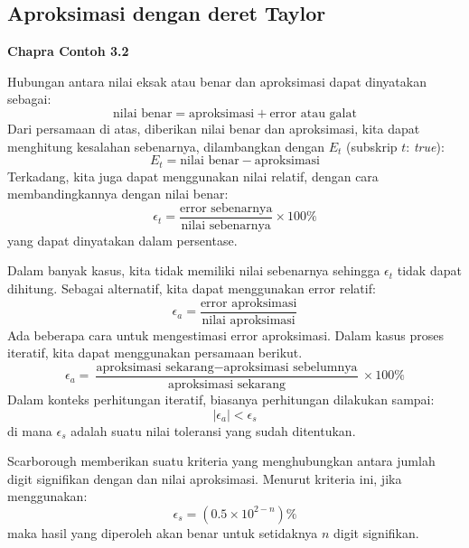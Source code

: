 \subsection{Aproksimasi dengan deret Taylor}

\textbf{Chapra Contoh 3.2}

Hubungan antara nilai eksak atau benar dan aproksimasi dapat dinyatakan
sebagai:
\begin{equation*}
\text{nilai benar} = \text{aproksimasi} + \text{error atau galat}
\end{equation*}
Dari persamaan di atas, diberikan nilai benar dan aproksimasi, kita dapat menghitung
kesalahan sebenarnya, dilambangkan dengan $E_t$ (subskrip $t$: \textit{true}):
\begin{equation}
E_t = \text{nilai benar} - \text{aproksimasi}
\end{equation}
Terkadang, kita juga dapat menggunakan nilai relatif, dengan cara membandingkannya
dengan nilai benar:
\begin{equation}
\epsilon_{t} = \frac{\text{error sebenarnya}}{\text{nilai sebenarnya}}\times 100\%
\end{equation}
yang dapat dinyatakan dalam persentase.

Dalam banyak kasus, kita tidak memiliki nilai sebenarnya sehingga $\epsilon_t$
tidak dapat dihitung. Sebagai alternatif, kita dapat menggunakan error relatif:
\begin{equation}
\epsilon_{a} = \frac{\text{error aproksimasi}}{\text{nilai aproksimasi}}
\end{equation}
Ada beberapa cara untuk mengestimasi error aproksimasi. Dalam kasus proses iteratif,
kita dapat menggunakan persamaan berikut.
\begin{equation}
\epsilon_{a} = \frac{\text{aproksimasi sekarang} - \text{aproksimasi sebelumnya}}%
{\text{aproksimasi sekarang}} \times 100\%
\end{equation}
Dalam konteks perhitungan iteratif, biasanya perhitungan dilakukan sampai:
\begin{equation}
|\epsilon_{a}| < \epsilon_{s}
\end{equation}
di mana $\epsilon_{s}$ adalah suatu nilai toleransi yang sudah ditentukan.

Scarborough memberikan suatu kriteria yang menghubungkan antara jumlah digit signifikan
dengan dan nilai aproksimasi. Menurut kriteria ini, jika menggunakan:
\begin{equation}
\epsilon_{s} = (0.5 \times 10^{2-n})\%
\end{equation}
maka hasil yang diperoleh akan benar untuk setidaknya $n$ digit signifikan.

